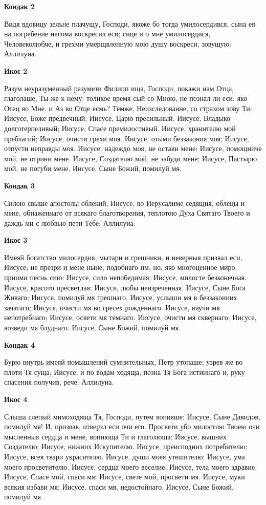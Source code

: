 \medskip
\bfseries Кондак 2\normalfont{}


Видя
вдовицу зельне плачущу, Господи, якоже бо тогда умилосердився, сына ея на погребение несома воскресил еси; сице и о мне умилосердися, Человеколюбче, и грехми умерщвленную мою душу воскреси, зовущую: Аллилуиа.


\medskip
\bfseries Икос 2\normalfont{}


Разум
неуразуменный разумети Филипп ища, Господи, покажи нам Отца, глаголаше; Ты же к нему: толикое время сый со Мною, не познал ли еси, яко Отец во Мне, и Аз во Отце есмь? Темже, Неизследованне, со страхом зову Ти: Иисусе, Боже предвечный; Иисусе, Царю пресильный. Иисусе, Владыко долготерпеливый; Иисусе, Спасе премилостивый. Иисусе, хранителю мой преблагий; Иисусе, очисти грехи моя. Иисусе, отыми беззакония моя; Иисусе, отпусти неправды моя. Иисусе, надеждо моя, не остави мене; Иисусе, помощниче мой, не отрини мене. Иисусе, Создателю мой, не забуди
мене; Иисусе, Пастырю мой, не погуби мене. Иисусе, Сыне Божий, помилуй мя.


\medskip
\bfseries Кондак 3\normalfont{}


Силою
свыше апостолы облекий, Иисусе, во Иерусалиме седящия, облецы и мене, обнаженнаго от всякаго благотворения, теплотою Духа Святаго Твоего и даждь ми с любвью пети Тебе: Аллилуиа.


\medskip
\bfseries Икос 3\normalfont{}


Имеяй
богатство милосердия, мытари и грешники, и неверныя призвал еси, Иисусе; не презри и мене ныне, подобнаго им, но, яко многоценное миро, приими песнь сию: Иисусе, сило непобедимая; Иисусе, милосте
безконечная. Иисусе, красото пресветлая; Иисусе, любы неизреченная. Иисусе, Сыне Бога Живаго; Иисусе, помилуй мя грешнаго. Иисусе, услыши мя в беззакониих зачатаго; Иисусе, очисти мя во гресех рожденнаго. Иисусе, научи мя непотребнаго; Иисусе, освети мя темнаго. Иисусе, очисти мя сквернаго; Иисусе, возведи мя блуднаго. Иисусе, Сыне Божий, помилуй мя.


\medskip
\bfseries Кондак 4\normalfont{}


Бурю
внутрь имеяй помышлений сумнительных, Петр утопаше; узрев же во плоти Тя суща, Иисусе, и по водам ходяща, позна Тя Бога истиннаго и, руку спасения получив, рече: Аллилуиа. 


\medskip
\bfseries Икос 4\normalfont{}


Слыша
слепый мимоходяща Тя, Господи, путем вопияше: Иисусе, Сыне Давидов, помилуй мя! И, призвав, отверзл еси очи его. Просвети убо милостию Твоею очи мысленныя сердца и мене, вопиюща Ти и глаголюща: Иисусе, вышних Создателю; Иисусе, нижних Искупителю. Иисусе, преисподних потребителю; Иисусе, всея твари украсителю. Иисусе, души моея утешителю; Иисусе, ума моего просветителю. Иисусе, сердца моего веселие; Иисусе, тела моего здравие. Иисусе, Спасе мой, спаси мя; Иисусе, свете мой, просвети мя. Иисусе, муки всякия избави мя; Иисусе, спаси мя, недостойнаго. Иисусе, Сыне Божий, помилуй мя.



